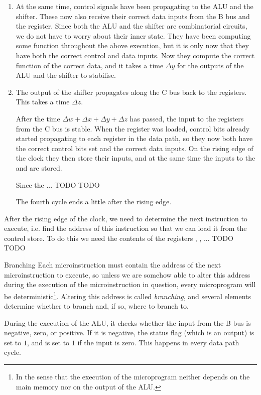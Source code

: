 \documentclass[article, a4paper, 11pt, oneside]{memoir}
\numberwithin{equation}{chapter}
\begin{document}
\begin{notelist}
\begin{enumerate}
    \item At the same time, control signals have been propagating to the ALU and the shifter. These now also receive their correct data inputs from the B bus and the  register. Since both the ALU and the shifter are combinatorial circuits, we do not have to worry about their inner state. They have been computing some function throughout the above execution, but it is only now that they have both the correct control and data inputs. Now they compute the correct function of the correct data, and it takes a time $\Delta y$ for the outputs of the ALU and the shifter to stabilise.

    \item The output of the shifter propagates along the C bus back to the registers. This takes a time $\Delta z$.

    After the time $\Delta w + \Delta x + \Delta y + \Delta z$ has passed, the input to the registers from the C bus is stable. When the  register was loaded, control bits already started propagating to each register in the data path, so they now both have the correct control bits set and the correct data inputs. On the rising edge of the clock they then store their inputs, and at the same time the inputs to the  and  are stored.

    Since the ... TODO TODO
    
    The fourth cycle ends a little after the rising edge.
\end{enumerate}

After the rising edge of the clock, we need to determine the next instruction to execute, i.e. find the address of this instruction so that we can load it from the control store. To do this we need the contents of the registers , ,  ... TODO TODO

\item[Branching]
Each microinstruction must contain the address of the next microinstruction to execute, so unless we are somehow able to alter this address during the execution of the microinstruction in question, every microprogram will be deterministic\footnote{In the sense that the execution of the microprogram neither depends on the main memory nor on the output of the ALU.}. Altering this address is called \emph{branching}, and several elements determine whether to branch and, if so, where to branch to.

During the execution of the ALU, it checks whether the input from the B bus is negative, zero, or positive. If it is negative, the status flag (which is an output)  is set to $1$, and  is set to $1$ if the input is zero. This happens in every data path cycle.


\end{notelist}
\end{document}
